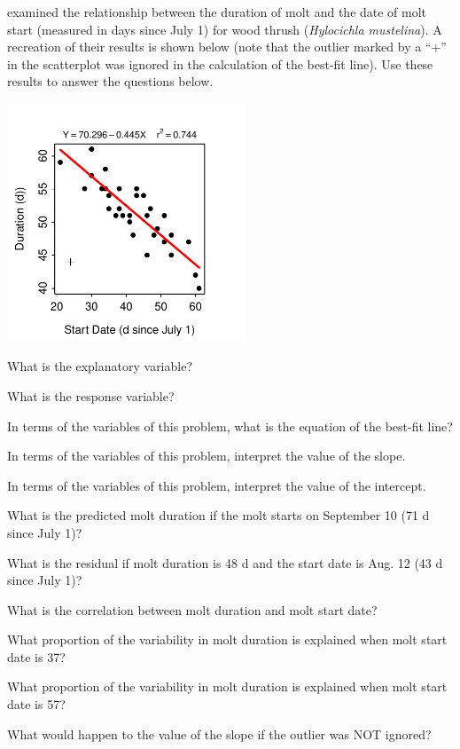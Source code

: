 \documentclass[10pt,openany]{book}\usepackage[]{graphicx}\usepackage[]{color}
\begin{document}
\begin{exsection}
  \item \label{revex:RegThrush} \cite{VegaRivera1998} examined the relationship between the duration of molt and the date of molt start (measured in days since July 1) for wood thrush (\textit{Hylocichla mustelina}).  A recreation of their results is shown below (note that the outlier marked by a ``+'' in the scatterplot was ignored in the calculation of the best-fit line).  Use these results to answer the questions below.  

\begin{center}
  \includegraphics[width=2.8in]{Figs/MoltFLP-1}
\end{center}
    \begin{Enumerate}
      \item What is the explanatory variable?
      \item What is the response variable?
      \item In terms of the variables of this problem, what is the equation of the best-fit line?
      \item In terms of the variables of this problem, interpret the value of the slope.
      \item In terms of the variables of this problem, interpret the value of the intercept.
      \item What is the predicted molt duration if the molt starts on September 10 (71 d since July 1)?
      \item What is the residual if molt duration is 48 d and the start date is Aug. 12 (43 d since July 1)?
      \item What is the correlation between molt duration and molt start date?
      \item What proportion of the variability in molt duration is explained when molt start date is 37?
      \item What proportion of the variability in molt duration is explained when molt start date is 57?
      \item What would happen to the value of the slope if the outlier was NOT ignored?
    \end{Enumerate}


\end{exsection}
\end{document}
